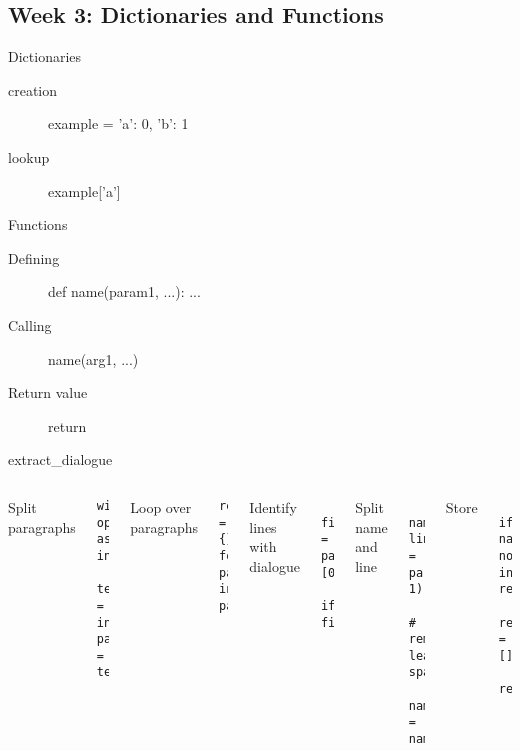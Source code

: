 \documentclass[aspectratio=169,usenames,dvipsnames]{beamer}
\begin{document}
\subsection{Week 3: Dictionaries and Functions}
\begin{frame}[fragile]{Dictionaries}
    \begin{description}
        \item[creation] example = {'a': 0, 'b': 1}
        \item[lookup] example['a']
    \end{description}
\end{frame}
\begin{frame}[fragile]{Functions}
    \begin{description}
        \item[Defining] def name(param1, ...): ...
        \item[Calling] name(arg1, ...)
        \item[Return value] return
    \end{description}
\end{frame}
\begin{frame}[fragile]{extract\_dialogue}
\begin{columns}
Split paragraphs
\begin{lstlisting}
with open(filename) as infile:
    text = infile.read()
paragraphs = text.split('\n\n')
\end{lstlisting}
\pause
Loop over paragraphs
\begin{lstlisting}
result = {}
for para in paragraphs:
\end{lstlisting}

\pause
Identify lines with dialogue
\begin{lstlisting}
    first_token = para.split()[0]
    if first_token.endswith('.'):
\end{lstlisting}
\pause Split name and line
\begin{lstlisting}
        name, line = para.split('.', 1)
        # remove leading/trailing spaces
        name = name.strip()
\end{lstlisting}
Store
\begin{lstlisting}
        if name not in result:
            result[name] = []
        result[name].append(line)
\end{lstlisting}
\end{columns}
\end{frame}
\end{document}
